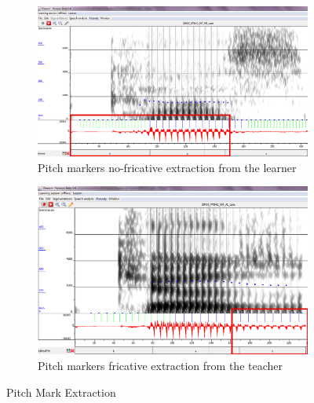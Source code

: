 \documentclass[11pt]{beamer}
\begin{document}
\begin{frame}

\begin{figure}
\begin{subfigure}{.5\textwidth}
  \centering
  \includegraphics[width=0.9\linewidth]{images/case_learner-nonFricative.PNG}
  \caption{Pitch markers no-fricative extraction from the learner}
  \label{fig:sfig1}
\end{subfigure}%
\begin{subfigure}{.5\textwidth}
  \centering
  \includegraphics[width=0.9\linewidth]{images/teacher_case_pitchMarks.PNG}
  \caption{Pitch markers fricative extraction from the teacher}
  \label{fig:sfig2}
\end{subfigure}
\caption{Pitch Mark Extraction}
\label{fig:fig}
\end{figure}
\end{frame}
\end{document}
